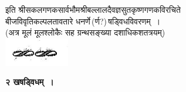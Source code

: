\documentclass[11pt, openany]{book}
\begin{document}
\begin{center}
इति श्रीसकलगणकसार्वभौमश्रीबल्लालदैवज्ञसुतकृष्णगणकविरचिते\\
बीजविवृतिकल्पलतावतारे धनर्णे\,(र्ण?)\,षड्विधविवरणम्~।\\
(अत्र मूलं मूलश्लोकैः सह ग्रन्थसङ्ख्या दशाधिकशतत्रयम्) \\
\vspace{3.5cm}
\includegraphics[scale=0.8]{graphics/Capture34.png}
\end{center}

\afterpage{\fancyhead[LE,RO]{\thepage}}
\cfoot{}
\newpage
\thispagestyle{empty}
 \label{ch2}
\begin{center}
{\LARGE \textbf{२ खषड्विधम्~।}}
\end{center}
\end{document}
